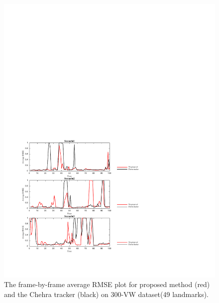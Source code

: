 \documentclass[a4paper, 10pt, conference]{ieeeconf}      %
\begin{document}
\begin{figure}[htbp]
        \centering
        \includegraphics[width=\textwidth,height=0.6\textheight]{Figures_3Secnatios.pdf}
        \caption{
        The frame-by-frame average RMSE plot for proposed method (red) and the Chehra tracker (black) on 300-VW dataset(49 landmarks).
        }
        \label{fig:nmse2}  
\end{figure}
\end{document}
